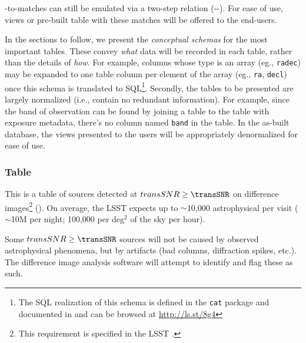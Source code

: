 \documentclass[SE,lsstdraft,toc]{lsstdoc}
\begin{document}
\DIASource-to-\Object matches can still be emulated via a two-step relation (\DIASource-\DIAObject-\Object). For ease of use, views or pre-built table with these matches will be offered to the end-users.


In the sections to follow, we present the \emph{conceptual schemas} for the most important \DB tables. These convey \emph{what} data will be recorded in each table, rather than the details of \emph{how}. For example, columns whose type is an array (eg., \texttt{radec}) may be expanded to one table column per element of the array (eg., \texttt{ra}, \texttt{decl}) once this schema is translated to SQL\footnote{The SQL realization of this schema is defined in the \texttt{cat} package and documented in  and can be browsed at \url{http://ls.st/8g4}}. Secondly, the tables to be presented are largely normalized (i.e., contain no redundant information). For example, since the band of observation can be found by joining a \DIASource table to the table with exposure metadata, there's no column named \texttt{band} in the \DIASource table. In the as-built database, the views presented to the users will be appropriately denormalized for ease of use.

\subsubsection{\DIASource Table}

This is a table of sources detected at $transSNR \geq \transSNR$  on difference images\footnote{This requirement is specified in the LSST \SRD.} (\DIASources).
On average, the LSST \SRD expects
up to
$\sim$10,000 astrophysical \DIASources per visit ($\sim$10M per night; 100,000 per deg$^2$
of the sky per hour).

Some $transSNR \geq \transSNR$ sources will not be caused by observed astrophysical phenomena, but by artifacts (bad columns, diffraction spikes, etc.). The difference image analysis software will attempt to identify and flag these as such.
\end{document}
